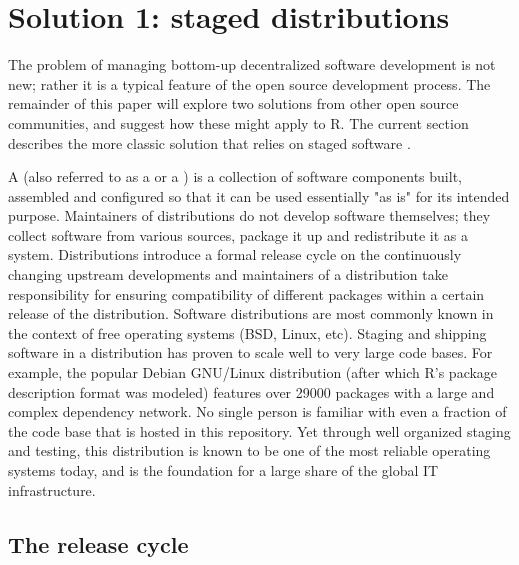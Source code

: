 \section{Solution 1: staged distributions}

The problem of managing bottom-up decentralized software development is not
new; rather it is a typical feature of the open source development
process. The remainder of this paper will explore two solutions from other open
source communities, and suggest how these might apply to R. The current section
describes the more classic solution that relies on staged software
.

A  (also referred to as a  or a )
is a collection of software components built, assembled and configured so that
it can be used essentially "as is" for its intended purpose. Maintainers of
distributions do not develop software themselves; they collect software from
various sources, package it up and redistribute it as a system. Distributions
introduce a formal release cycle on the continuously changing upstream
developments and maintainers of a distribution take responsibility for ensuring
compatibility of different packages within a certain release of the
distribution. Software distributions are most commonly known in the context of
free operating systems (BSD, Linux, etc). Staging and shipping software in a
distribution has proven to scale well to very large code bases. For example,
the popular Debian GNU/Linux distribution (after which R's package description
format was modeled) features over 29000 packages with a large and complex
dependency network. No single person is familiar with even a fraction of the
code base that is hosted in this repository. Yet through well organized staging and
testing, this distribution is known to be one of the most reliable operating
systems today, and is the foundation for a large share of the global IT
infrastructure.

\subsection{The release cycle}

